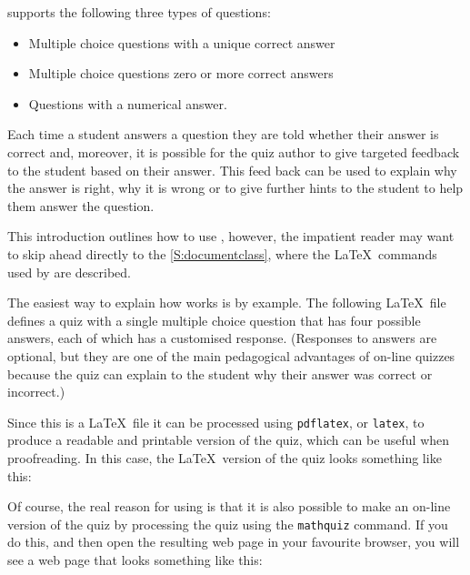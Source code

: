 \documentclass[svgnames]{article}
\begin{document}
    \MathQuiz supports the following three types of questions:
    \begin{itemize}
      \item Multiple choice questions with a unique correct answer
      \item Multiple choice questions zero or more correct answers
      \item Questions with a numerical answer.
    \end{itemize}
    Each time a student answers a question they are told whether their
    answer is correct and, moreover, it is possible for the quiz author
    to give targeted feedback to the student based on their answer. This
    feed back can be used to explain why the answer is right, why it is
    wrong or to give further hints to the student to help them answer the
    question.

    This introduction outlines how to use \MathQuiz, however, the
    impatient reader may want to skip ahead directly to the
    \autoref{S:documentclass}, where the \LaTeX\ commands used by
    \MathQuiz are described.

    The easiest way to explain how \MathQuiz works is by example. The
    following \LaTeX\ file defines a quiz with a single multiple choice
    question that has four possible answers, each of which has a
    customised response.  (Responses to answers are optional, but they
    are one of the main pedagogical advantages of on-line quizzes
    because the quiz can explain to the student why their answer was
    correct or incorrect.)

    

    Since this is a \LaTeX\ file it can be processed using
    \texttt{pdflatex}, or \texttt{latex}, to produce a readable and
    printable version of the quiz, which can be useful when
    proofreading. In this case, the \LaTeX\ version of the quiz looks
    something like this:


    Of course, the real reason for using \MathQuiz is that it is also
    possible to make an on-line version of the quiz by processing the
    quiz using the \texttt{mathquiz} command. If you do this, and then open
    the resulting web page in your favourite browser, you will see a web page
    that looks something like this:

\end{document}

